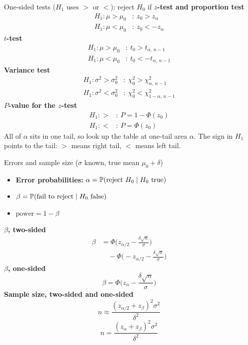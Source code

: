\begin{formulabox}{One-sided tests ($H_1$ uses $>$ or $<$): reject $H_0$ if}
\textbf{$z$-test and proportion test}
\[ \begin{aligned} H_1:\mu>\mu_0&:\ z_0>z_\alpha\\ H_1:\mu<\mu_0&:\ z_0<-z_\alpha\end{aligned} \]
\textbf{$t$-test}
\[ \begin{aligned} H_1:\mu>\mu_0&:\ t_0>t_{\alpha,\,n-1}\\ H_1:\mu<\mu_0&:\ t_0<-t_{\alpha,\,n-1}\end{aligned} \]
\textbf{Variance test}
\[ \begin{aligned} H_1:\sigma^2>\sigma_0^2&:\ \chi_0^2>\chi^2_{\alpha,\,n-1}\\ H_1:\sigma^2<\sigma_0^2&:\ \chi_0^2<\chi^2_{1-\alpha,\,n-1}\end{aligned} \]
\textbf{$P$-value for the $z$-test}
\[ \begin{aligned} H_1:>&:\ P=1-\Phi(z_0)\\ H_1:<&:\ P=\Phi(z_0)\end{aligned} \]
All of $\alpha$ sits in one tail, so look up the table at one-tail area $\alpha$. The sign in $H_1$ points to the tail: $>$ means right tail, $<$ means left tail.
\end{formulabox}

\begin{formulabox}{Errors and sample size ($\sigma$ known, true mean $\mu_0+\delta$)}
\begin{itemize}
  \item \textbf{Error probabilities:} $\alpha=\mathbb{P}(\text{reject }H_0\mid H_0\text{ true})$
  \item $\beta=\mathbb{P}(\text{fail to reject}\mid H_0\text{ false})$
  \item $\text{power}=1-\beta$
\end{itemize}
\textbf{$\beta$, two-sided}
\[ \begin{aligned}\beta&=\Phi\!\Big(z_{\alpha/2}-\frac{\delta\sqrt n}{\sigma}\Big)\\&\quad-\Phi\!\Big(-z_{\alpha/2}-\frac{\delta\sqrt n}{\sigma}\Big)\end{aligned} \]
\textbf{$\beta$, one-sided}
\[ \beta=\Phi\!\Big(z_\alpha-\frac{\delta\sqrt n}{\sigma}\Big) \]
\textbf{Sample size, two-sided and one-sided}
\[ n\approx\frac{(z_{\alpha/2}+z_\beta)^2\sigma^2}{\delta^2} \]
\[ n=\frac{(z_\alpha+z_\beta)^2\sigma^2}{\delta^2} \]
\end{formulabox}

